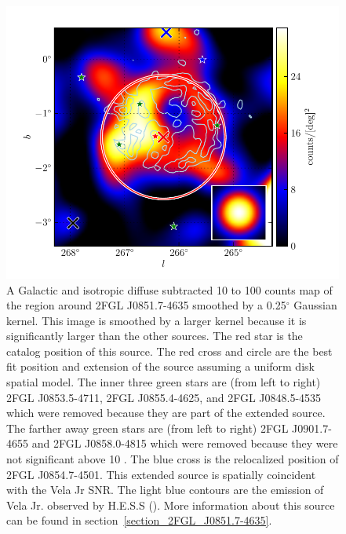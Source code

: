 \documentclass[12pt,preprint]{aastex}
\newcommand{\gev}{\text{GeV}\xspace}
\newcommand{\tev}{\text{TeV}\xspace}
\renewcommand{\deg}{\ensuremath{^\circ}\xspace}
\begin{document}
\begin{figure}
  \begin{center}
    \includegraphics[type=pdf,ext=.pdf,read=.pdf]{source_plots/source_Vela_Jr}
  \end{center}
  \caption{A Galactic and isotropic diffuse subtracted 10 \gev to 100
  \gev counts map of the region around 2FGL J0851.7-4635 smoothed by
  a 0.25\deg Gaussian kernel. This image is smoothed by a larger
  kernel because it is significantly larger than the other sources.
  The red star is the catalog position of
  this source.  The red cross and circle are the best fit position
  and extension of the source assuming a uniform disk spatial model.
  The inner three green stars are (from left to right)
  2FGL J0853.5-4711,
  2FGL J0855.4-4625, and
  2FGL J0848.5-4535 which were 
  removed 
  because they are part of the extended source.  The farther away
  green stars are (from left to right) 
  2FGL J0901.7-4655 and
  2FGL J0858.0-4815 which were removed 
  because they were not significant above 10 \gev.  The blue cross 
  is the relocalized position of
  2FGL J0854.7-4501.  This
  extended source is spatially coincident with the Vela Jr SNR.
  The light blue contours are the \tev emission of Vela Jr. observed by
  H.E.S.S (\cite{vela_jr_hess}).  More information about this source 
  can be found in section~\ref{section_2FGL_J0851.7-4635}.
  }\label{Vela_Jr}
\end{figure}
\end{document}
